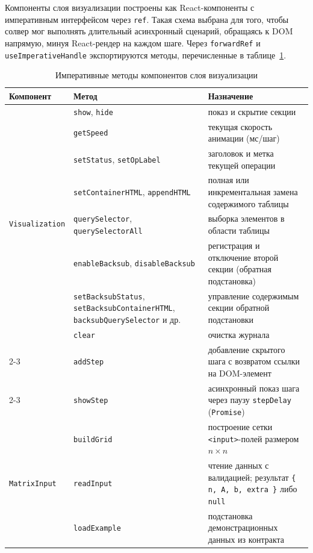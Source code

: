 \documentclass[12pt, oneside]{book}
\begin{document}
    \quad Компоненты слоя визуализации построены как React-компоненты с императивным интерфейсом через \texttt{ref}. Такая схема выбрана для того, чтобы солвер мог выполнять длительный асинхронный сценарий, обращаясь к DOM напрямую, минуя React-рендер на каждом шаге. Через \texttt{forwardRef} и\\ \texttt{useImperativeHandle} экспортируются методы, перечисленные в таблице~\ref{tab:viz_methods}.

\begin{table}[!htbp]
\centering
\scriptsize
\renewcommand{\arraystretch}{1.15}
\begin{tabular}{|p{2.5cm}|p{4.2cm}|p{6.1cm}|}
\hline
\rowcolor{thbg} \textbf{Компонент} & \textbf{Метод} & \textbf{Назначение} \\
\hline
\multirow{8}{*}{\texttt{Visualization}}
& \texttt{show}, \texttt{hide} & показ и скрытие секции \\ \cline{2-3}
& \texttt{getSpeed} & текущая скорость анимации (мс/шаг) \\ \cline{2-3}
& \texttt{setStatus}, \texttt{setOpLabel} & заголовок и метка текущей операции \\ \cline{2-3}
& \texttt{setContainerHTML}, \texttt{appendHTML} & полная или инкрементальная замена содержимого таблицы \\ \cline{2-3}
& \texttt{querySelector}, \texttt{querySelectorAll} & выборка элементов в области таблицы \\ \cline{2-3}
& \texttt{enableBacksub}, \texttt{disableBacksub} & регистрация и отключение второй секции (обратная подстановка) \\ \cline{2-3}
& \texttt{setBacksubStatus}, \texttt{setBacksubContainerHTML}, \texttt{backsubQuery\-Selector} и др. & управление содержимым секции обратной подстановки \\
\hline
\multirow{3}{*}{\texttt{StepLog}}
& \texttt{clear} & очистка журнала \\ \cline{2-3}
& \texttt{addStep} & добавление скрытого шага с возвратом ссылки на DOM-элемент \\ \cline{2-3}
& \texttt{showStep} & асинхронный показ шага через паузу \texttt{stepDelay} (\texttt{Promise}) \\
\hline
\multirow{3}{*}{\texttt{MatrixInput}}
& \texttt{buildGrid} & построение сетки \texttt{<input>}-полей размером $n \times n$ \\ \cline{2-3}
& \texttt{readInput} & чтение данных с валидацией; результат \texttt{\{ n, A, b, extra \}} либо \texttt{null} \\ \cline{2-3}
& \texttt{loadExample} & подстановка демонстрационных данных из контракта \\
\hline
\end{tabular}
\caption{Императивные методы компонентов слоя визуализации}
\label{tab:viz_methods}
\end{table}
\end{document}
